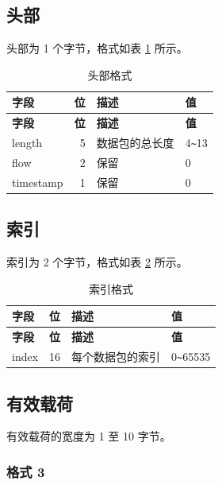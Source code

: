 \documentclass[main\_\_CN.tex]{subfiles}
\begin{document}
\subsection{头部}

头部为 1 个字节，格式如表 \ref{tab:header} 所示。


\begin{longtable}[c]{ |l|r|l|l| }
    \caption{头部格式}
    \label{tab:header}
    \\\hline\rowcolor{lightgray}
    \textbf{字段} & \textbf{位} & \textbf{描述} & \textbf{值}\\\hline
    \endfirsthead
    \hline\rowcolor{lightgray}
    \textbf{字段} & \textbf{位} & \textbf{描述} & \textbf{值}\\\hline
    \endhead
    \endfoot
    \endlastfoot

    length & 5 & 数据包的总长度 & 4\verb+~+13 \\\hline
    flow & 2 & 保留 & 0 \\\hline
    timestamp & 1 & 保留 & 0 \\\hline
 \end{longtable}


\subsection{索引}

索引为 2 个字节，格式如表 \ref{tab:index} 所示。

\begin{longtable}[c]{ |l|r|l|l| }
    \caption{索引格式}
    \label{tab:index}
    \\\hline\rowcolor{lightgray}
    \textbf{字段} & \textbf{位} & \textbf{描述} & \textbf{值}\\\hline
    \endfirsthead
    \textbf{字段} & \textbf{位} & \textbf{描述} & \textbf{值}\\\hline
    \endhead
    \endfoot
    \endlastfoot

    index & 16 & 每个数据包的索引 & 0\verb+~+65535  \\\hline
 \end{longtable}

\subsection{有效载荷}

有效载荷的宽度为 1 至 10 字节。

\subsubsection{格式 3}
\end{document}
